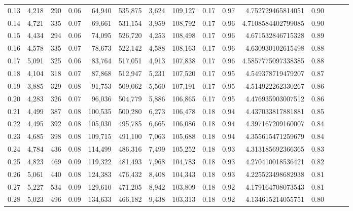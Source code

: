\begin{tabular}{rrrrrrrrrrrrrrr}
0.13 &   4,218 &    290 &  0.06 &   64,940 &  535,875 &    3,624 &  109,127 &  0.17 &  0.97 &     4.752729465814051 &      0.90 \\
0.14 &   4,721 &    335 &  0.07 &   69,661 &  531,154 &    3,959 &  108,792 &  0.17 &  0.96 &    4.7108584402799085 &      0.90 \\
0.15 &   4,434 &    294 &  0.06 &   74,095 &  526,720 &    4,253 &  108,498 &  0.17 &  0.96 &     4.671532846715328 &      0.89 \\
0.16 &   4,578 &    335 &  0.07 &   78,673 &  522,142 &    4,588 &  108,163 &  0.17 &  0.96 &     4.630930102615498 &      0.88 \\
0.17 &   5,091 &    325 &  0.06 &   83,764 &  517,051 &    4,913 &  107,838 &  0.17 &  0.96 &    4.5857775097338385 &      0.88 \\
0.18 &   4,104 &    318 &  0.07 &   87,868 &  512,947 &    5,231 &  107,520 &  0.17 &  0.95 &     4.549378719479207 &      0.87 \\
0.19 &   3,885 &    329 &  0.08 &   91,753 &  509,062 &    5,560 &  107,191 &  0.17 &  0.95 &     4.514922262330267 &      0.86 \\
0.20 &   4,283 &    326 &  0.07 &   96,036 &  504,779 &    5,886 &  106,865 &  0.17 &  0.95 &     4.476935903007512 &      0.86 \\
0.21 &   4,499 &    387 &  0.08 &  100,535 &  500,280 &    6,273 &  106,478 &  0.18 &  0.94 &     4.437033817881881 &      0.85 \\
0.22 &   4,495 &    392 &  0.08 &  105,030 &  495,785 &    6,665 &  106,086 &  0.18 &  0.94 &     4.397167209160007 &      0.84 \\
0.23 &   4,685 &    398 &  0.08 &  109,715 &  491,100 &    7,063 &  105,688 &  0.18 &  0.94 &     4.355615471259679 &      0.84 \\
0.24 &   4,784 &    436 &  0.08 &  114,499 &  486,316 &    7,499 &  105,252 &  0.18 &  0.93 &     4.313185692366365 &      0.83 \\
0.25 &   4,823 &    469 &  0.09 &  119,322 &  481,493 &    7,968 &  104,783 &  0.18 &  0.93 &     4.270410018536421 &      0.82 \\
0.26 &   5,061 &    440 &  0.08 &  124,383 &  476,432 &    8,408 &  104,343 &  0.18 &  0.93 &     4.225523498682938 &      0.81 \\
0.27 &   5,227 &    534 &  0.09 &  129,610 &  471,205 &    8,942 &  103,809 &  0.18 &  0.92 &     4.179164708073543 &      0.81 \\
0.28 &   5,023 &    496 &  0.09 &  134,633 &  466,182 &    9,438 &  103,313 &  0.18 &  0.92 &     4.134615214055751 &      0.80 \\

\end{tabular}
